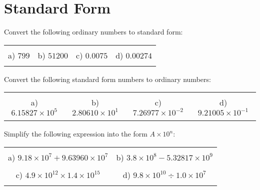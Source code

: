 \documentclass[12pt]{article}
\begin{document}
\section{Standard Form}
Convert the following ordinary numbers to standard form:
\begin{table}[h!]
\centering
\begin{tabular}{c c c c}
\hspace{2cm} & \hspace{5cm} & \hspace{5cm} & \hspace{4cm}\\
a) $799$ & b) $51200$ & c) $0.0075$ & d) $0.00274$\\ \\
\end{tabular}
\end{table}
\newline
Convert the following standard form numbers to ordinary numbers:
\begin{table}[h!]
\centering
\begin{tabular}{c c c c}
\hspace{2cm} & \hspace{5cm} & \hspace{5cm} & \hspace{4cm}\\
a) $6.15827\times10^5$ & b) $2.80610\times10^1$ & c) $7.26977\times10^{-2}$ & d) $9.21005\times10^{-1}$\\ \\
\end{tabular}
\end{table}
\newline
Simplify the following expression into the form $A\times10^n$:
\begin{table}[h!]
\centering
\begin{tabular}{c c}
\hspace{5cm} & \hspace{5cm}\\
a) $9.18\times10^{7} + 9.63960\times10^{7}$ & b) $3.8\times10^{8} - 5.32817\times10^{9}$\\ \\
c) $4.9\times10^{12}\times1.4\times10^{15}$ & d) $9.8\times10^{10}\div1.0\times10^{7}$\\ \\
\end{tabular}
\end{table}
\newline
\newpage
\end{document}
